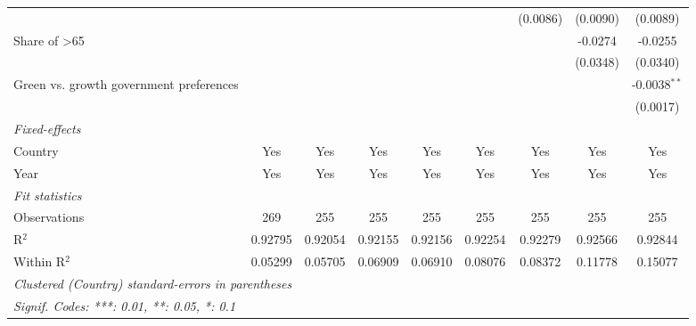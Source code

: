 \begin{table}[htbp]
\begin{tabular}{lcccccccc}
                                                  &               &              &          &          &          & (0.0086) & (0.0090) & (0.0089)\\   
      Share of >65                                &               &              &          &          &          &          & -0.0274  & -0.0255\\   
                                                  &               &              &          &          &          &          & (0.0348) & (0.0340)\\   
      Green vs. growth government preferences     &               &              &          &          &          &          &          & -0.0038$^{**}$\\   
                                                  &               &              &          &          &          &          &          & (0.0017)\\   
      \midrule
      \emph{Fixed-effects}\\
      Country                                     & Yes           & Yes          & Yes      & Yes      & Yes      & Yes      & Yes      & Yes\\  
      Year                                        & Yes           & Yes          & Yes      & Yes      & Yes      & Yes      & Yes      & Yes\\  
      \midrule
      \emph{Fit statistics}\\
      Observations                                & 269           & 255          & 255      & 255      & 255      & 255      & 255      & 255\\  
      R$^2$                                       & 0.92795       & 0.92054      & 0.92155  & 0.92156  & 0.92254  & 0.92279  & 0.92566  & 0.92844\\  
      Within R$^2$                                & 0.05299       & 0.05705      & 0.06909  & 0.06910  & 0.08076  & 0.08372  & 0.11778  & 0.15077\\  
      \midrule \midrule
      \multicolumn{9}{l}{\emph{Clustered (Country) standard-errors in parentheses}}\\
      \multicolumn{9}{l}{\emph{Signif. Codes: ***: 0.01, **: 0.05, *: 0.1}}\\
   \end{tabular}
\end{table}


